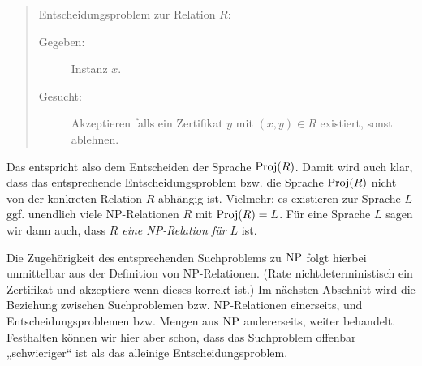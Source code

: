 \begin{quote}
    Entscheidungsproblem zur Relation $R$:
    \begin{description}
        \item[Gegeben:] Instanz $x$.
        \item[Gesucht:] Akzeptieren falls ein Zertifikat $y$ mit $(x,y)\in  R$ existiert, sonst ablehnen.
    \end{description}
\end{quote}
Das entspricht also dem Entscheiden der Sprache $\operatorname{Proj}(R)$. Damit wird auch klar, dass das entsprechende Entscheidungsproblem bzw. die Sprache $\operatorname{Proj}(R)$ nicht von der konkreten Relation $R$ abhängig ist. Vielmehr: es existieren zur Sprache $L$ ggf. unendlich viele NP-Relationen $R$ mit $\operatorname{Proj}(R)=L$.  Für eine Sprache $L$ sagen wir dann auch, dass \emph{$R$ eine NP-Relation für $L$} ist.

Die Zugehörigkeit des entsprechenden Suchproblems zu $\mathrm{NP}$ folgt hierbei unmittelbar aus der Definition von NP-Relationen. (Rate nichtdeterministisch ein Zertifikat und akzeptiere wenn dieses korrekt ist.)
Im nächsten Abschnitt wird die Beziehung zwischen Suchproblemen bzw. NP-Relationen einerseits, und Entscheidungsproblemen bzw. Mengen aus $\mathrm{NP}$ andererseits, weiter behandelt.
Festhalten können wir hier aber schon, dass das Suchproblem offenbar „schwieriger“ ist als das alleinige Entscheidungsproblem.

